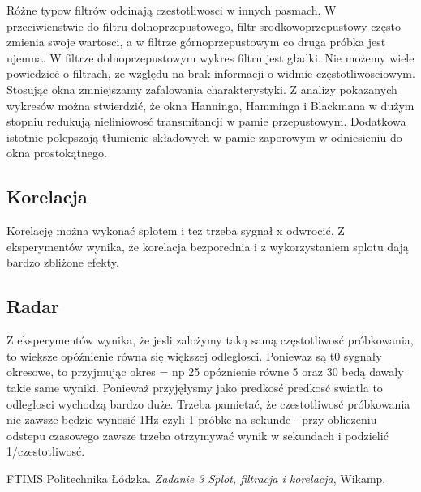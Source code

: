 \documentclass[12pt]{article}
\begin{document}
Różne typow filtrów odcinają czestotliwosci w innych pasmach. W przeciwienstwie do filtru dolnoprzepustowego, filtr srodkowoprzepustowy często zmienia swoje wartosci, a  w filtrze górnoprzepustowym co druga próbka jest ujemna. W filtrze dolnoprzepustowym wykres filtru jest gładki.
Nie możemy wiele powiedzieć o filtrach, ze względu na brak informacji  o widmie częstotliwosciowym.
Stosując okna zmniejszamy zafalowania charakterystyki. 
Z analizy pokazanych wykresów można stwierdzić, że okna Hanninga, Hamminga i Blackmana w dużym stopniu redukują nieliniowosć transmitancji w pamie przepustowym. Dodatkowa istotnie polepszają tłumienie składowych w pamie zaporowym w odniesieniu do okna prostokątnego.


\subsection{Korelacja}
Korelację można wykonać splotem i tez trzeba sygnał x odwrocić.
Z eksperymentów wynika, że korelacja bezporednia i z wykorzystaniem splotu dają bardzo zbliżone efekty.


\subsection{Radar}
Z eksperymentów wynika, że jesli zalożymy taką samą częstotliwosć próbkowania, to wieksze opóźnienie równa się większej odleglosci. Poniewaz są t0 sygnały okresowe, to przyjmując okres = np 25 opóznienie równe 5 oraz 30 bedą dawaly takie same wyniki.
Ponieważ przyjęłysmy jako predkosć predkosć swiatla to odleglosci wychodzą bardzo duże.
Trzeba pamietać, że czestotliwosć próbkowania nie zawsze będzie wynosić 1Hz czyli 1 próbke na sekunde - przy obliczeniu odstepu czasowego zawsze trzeba otrzymywać wynik w sekundach i podzielić 1/czestotliwosć.

\begin{thebibliography}{0}
  FTIMS Politechnika Łódzka.
    \textsl{Zadanie 3 Splot, filtracja i korelacja}, Wikamp.
\end{thebibliography}
\end{document}
